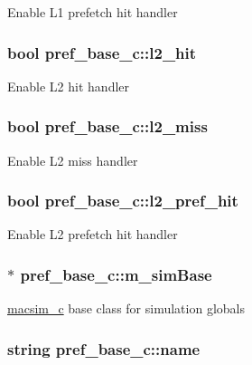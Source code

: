 \label{classpref__base__c_ad687a452e183c6fa0d6dce6371a5dfae}
Enable L1 prefetch hit handler \hypertarget{classpref__base__c_a75478fddf153aa4ae23fc7434307dda8}{
\subsubsection[{l2\_\-hit}]{\setlength{\rightskip}{0pt plus 5cm}bool {\bf pref\_\-base\_\-c::l2\_\-hit}}}
\label{classpref__base__c_a75478fddf153aa4ae23fc7434307dda8}
Enable L2 hit handler \hypertarget{classpref__base__c_a3c4a6b2464e480335b1e5776b4b69bf6}{
\subsubsection[{l2\_\-miss}]{\setlength{\rightskip}{0pt plus 5cm}bool {\bf pref\_\-base\_\-c::l2\_\-miss}}}
\label{classpref__base__c_a3c4a6b2464e480335b1e5776b4b69bf6}
Enable L2 miss handler \hypertarget{classpref__base__c_a3cd5ebbc80aeee89f7e4287b0ed930e3}{
\subsubsection[{l2\_\-pref\_\-hit}]{\setlength{\rightskip}{0pt plus 5cm}bool {\bf pref\_\-base\_\-c::l2\_\-pref\_\-hit}}}
\label{classpref__base__c_a3cd5ebbc80aeee89f7e4287b0ed930e3}
Enable L2 prefetch hit handler \hypertarget{classpref__base__c_ab4840aa16085f9351c4acde5e8232ded}{
\subsubsection[{m\_\-simBase}]{$\ast$ {\bf pref\_\-base\_\-c::m\_\-simBase}}}
\label{classpref__base__c_ab4840aa16085f9351c4acde5e8232ded}
\hyperlink{classmacsim__c}{macsim\_\-c} base class for simulation globals \hypertarget{classpref__base__c_a65b7301bf63f68f8d6c7b893dffa3353}{
\subsubsection[{name}]{\setlength{\rightskip}{0pt plus 5cm}string {\bf pref\_\-base\_\-c::name}}}
